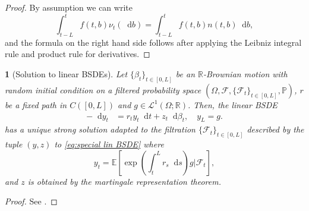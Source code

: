 \documentclass[11pt,oneside,english,reqno,dvipsnames,table]{amsart}
\numberwithin{equation}{section}
\theoremstyle{plain}
\theoremstyle{definition}
\theoremstyle{remark}
\theoremstyle{plain}
\theoremstyle{plain}
\newtheorem{prop}[thm]{\protect\propositionname}
\theoremstyle{plain}
\theoremstyle{plain}
\theoremstyle{plain}
\theoremstyle{plain}
\theoremstyle{plain}
\providecommand{\propositionname}{Proposition}
\newcommand{\cF}{\mathcal{F}}
\newcommand{\EE}{\mathbb{E}}
\newcommand{\PP}{\mathbb{P}}
\newcommand{\dd}{\mathop{}\!\mathrm{d}}
\newcommand{\mbR}{\mathbb{R}}
\newcommand{\msL}{\mathscr{L}}
\numberwithin{thm}{section}
\begin{document}
\begin{proof}
     By assumption we can write
     \begin{equation*}
         \int_{t-L}^t f(t,b) \nu_t(\dd b)  = \int_{t-L}^t f(t,b) n(t, b)\dd b, 
     \end{equation*}
     and the formula on the right hand side follows after applying the Leibniz integral rule and product rule for derivatives.
%
\end{proof}
%
\begin{prop}[Solution to linear BSDEs]\label{prop:bsde_linear_solution}
%
Let $\{\beta_t\}_{t\in [0,L]}$ be an $\mbR$-Brownian motion with random initial condition on a filtered probability space $(\Omega, \cF,\{\cF_t\}_{t\in [0,L]},\PP)$, $r$ be a fixed path in $ C([0,L])$ and $g\in \msL^1(\Omega;\mbR)$. Then, the linear BSDE 
%
\begin{equation}\label{eq:special lin BSDE}
\begin{aligned}
        -\dd y_t &= r_t y_t\dd t +z_t \dd \beta_t, \quad y_L=g.  
\end{aligned}
\end{equation}
%
 has a unique strong solution adapted to the filtration $\{\cF_t\}_{t\in [0,L]}$ described by the tuple $(y,z)$ to \eqref{eq:special lin BSDE} where
\begin{equation}\label{eq:explicit BSDE}
    y_t = \EE\left[\exp\left(\int_t^L r_s\dd s\right)g|\cF_t\right], 
\end{equation}
%
and $z$ is obtained by the martingale representation theorem.
\end{prop}
%
\begin{proof}
See \cite[Prop.~6.2.1.]{pham_09_continuous}. 
\end{proof}
%
%

%
%
\end{document}
